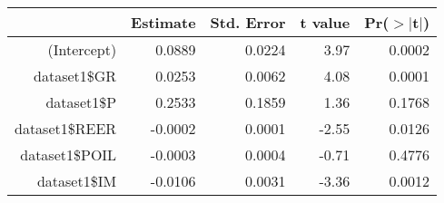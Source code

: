 \begin{table}[ht]
\centering
\begin{tabular}{rrrrr}
  \hline
 & Estimate & Std. Error & t value & Pr($>$$|$t$|$) \\ 
  \hline
(Intercept) & 0.0889 & 0.0224 & 3.97 & 0.0002 \\ 
  dataset1\$GR & 0.0253 & 0.0062 & 4.08 & 0.0001 \\ 
  dataset1\$P & 0.2533 & 0.1859 & 1.36 & 0.1768 \\ 
  dataset1\$REER & -0.0002 & 0.0001 & -2.55 & 0.0126 \\ 
  dataset1\$POIL & -0.0003 & 0.0004 & -0.71 & 0.4776 \\ 
  dataset1\$IM & -0.0106 & 0.0031 & -3.36 & 0.0012 \\ 
   \hline
\end{tabular}
\end{table}
